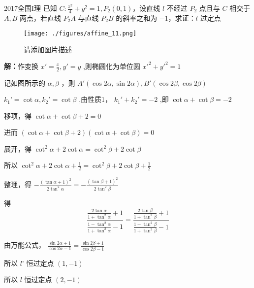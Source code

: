 \begin{example}{2017全国I理}
已知 \(C:\frac{x^2}4+y^2=1,P_2(0,1)\)，设直线 \(l\) 不经过 \(P_2\) 点且与 \(C\) 相交于 \(A,B\) 两点，若直线 \(P_2A\) 与直线 \(P_2B\) 的斜率之和为 \(-1\)，求证：\(l\) 过定点
\begin{figure}[ht]
\centering
\texttt{[image: ./figures/affine\_11.png]}
\caption{请添加图片描述} \label{affine_fig11}
\end{figure}
\textbf{解：}作变换 \(x'=\frac{x}{2},y'=y\) ,则椭圆化为单位圆 \(x'^2+y'^2=1\)

记如图所示的 \(\alpha,\beta\) ，则 \(A'(\cos2\alpha,\sin2\alpha),B'(\cos2\beta,\cos2\beta)\)

\(k_1’=\cot{\alpha},k_2'=\cot{\beta}\) ,由性质1， \(k_1'+k_2'=-2\) ,即 \(\cot{\alpha}+\cot{\beta}=-2\)

移项，得 \(\cot\alpha+\cot \beta+2=0\)

进而 \((\cot\alpha+\cot \beta+2)(\cot \alpha+\cot\beta)=0\)

展开，得 \(\cot^2\alpha+2\cot\alpha=\cot^2\beta+2\cot\beta\)

所以 \(\cot^2\alpha+2\cot\alpha+\frac{1}{2}=\cot^2\beta+2\cot\beta+\frac{1}{2}\)

整理，得 \(-\frac{(\tan\alpha+1)^2}{2\tan^2\alpha}=-\frac{(\tan\beta+1)^2}{2\tan^2\beta}\)

得 
$$\frac{\frac{2\tan\alpha}{1+\tan^2\alpha}+1}{\frac{1-\tan^2\alpha}{1+\tan^2\alpha}-1}=\frac{\frac{2\tan\beta}{1+\tan^2\beta}+1}{\frac{1-\tan^2\beta}{1+\tan^2\beta}-1}$$

由万能公式， \(\frac{\sin2\alpha+1}{\cos2\alpha-1}=\frac{\sin2\beta+1}{\cos2\beta-1}\)

所以 \(l’\) 恒过定点 \((1,-1)\)

所以 \(l\) 恒过定点 \((2,-1)\) 
\end{example}
